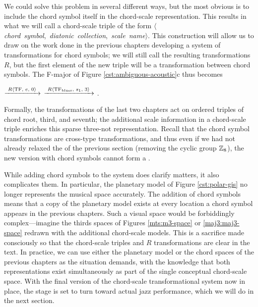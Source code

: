 We could solve this problem in several different ways, but the most obvious is
to include the chord symbol itself in the chord-scale representation. This
results in what we will call a chord-scale triple of the form
\mbox{$\langle$\emph{chord symbol}, \emph{diatonic collection}, \emph{scale
    name}$\rangle$}. This construction will allow us to draw on the work done
in the previous chapters developing a system of transformations for chord
symbols; we will still call the resulting transformations $R$, but the first
element of the new triple will be a transformation between chord
symbols. The F-major \tfo of Figure \ref{cst:ambiguous-acoustic}c
thus becomes \\
{ \centering {}
  $\xrightarrow{\text{ \mbox{\ensuremath{R\langle}TF, $e$, $0$\ensuremath{\rangle}} }}$ 
  $\xrightarrow{\text{ \mbox{\ensuremath{R\langle}TF\textsubscript{blues}, $s_1$, $3$\ensuremath{\rangle}} }}$
  .
  \par
}
\noindent Formally, the transformations of the last two chapters act on
ordered triples of chord root, third, and seventh; the additional scale
information in a chord-scale triple enriches this sparse three-not
representation. Recall that the chord symbol transformations are
cross-type transformations, and thus even if we had not already relaxed the
\gis of the previous section (removing the cyclic group $\mathbb{Z}_8$), the new
version with chord symbols cannot form a \gis.

While adding chord symbols to the system does clarify matters, it also
complicates them. In particular, the planetary model of Figure
\ref{cst:polar-gis} no longer represents the musical space accurately. The
addition of chord symbols means that a copy of the planetary model exists at
every location a chord symbol appears in the previous chapters.
Such a visual space would be forbiddingly complex---imagine the thirds spaces
of Figures \ref{mts:m3-space} or \ref{maj3:maj3-space} redrawn with the
additional chord-scale models. This is a sacrifice made consciously so that
the chord-scale triples and $R$ transformations are clear in the text. In
practice, we can use either the planetary model or the chord spaces of the
previous chapters as the situation demands, with the knowledge that both
representations exist simultaneously as part of the single conceptual
chord-scale space. With the final version of the chord-scale transformational
system now in place, the stage is set to turn toward actual jazz
performance, which we will do in the next section.


